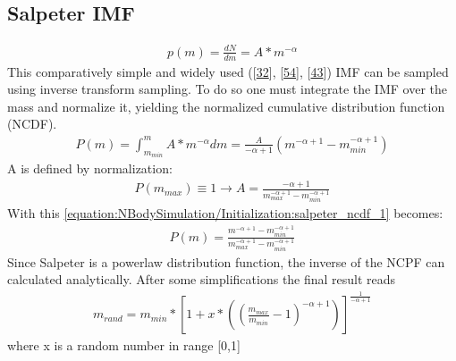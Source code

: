 \documentclass[letterpaper,10pt,english]{sphinxmanual}
\begin{document}
\subsection{Salpeter IMF}
\label{\detokenize{NBodySimulation/Initialization:salpeter-imf}}\begin{equation}\label{equation:NBodySimulation/Initialization:salpeter}
\begin{split}p(m)=\frac{dN}{dm}=A*m^{-\alpha }\end{split}
\end{equation}
\sphinxAtStartPar
This comparatively simple and widely used ({[}\hyperlink{cite.NBodySimulation/Appendix:id46}{32}{]}, {[}\hyperlink{cite.NBodySimulation/Appendix:id47}{54}{]}, {[}\hyperlink{cite.NBodySimulation/Appendix:id48}{43}{]}) IMF can be sampled using inverse transform sampling.
To do so one must integrate the IMF over the mass and normalize it, yielding the normalized cumulative distribution function (NCDF).
\begin{equation}\label{equation:NBodySimulation/Initialization:salpeter_ncdf_1}
\begin{split}P(m)=\int_{m_{min}}^{m}A*m^{-\alpha } dm = \frac{A}{-\alpha +1}\left ( m^{-\alpha +1} -m_{min}^{-\alpha +1}\right )\end{split}
\end{equation}
\sphinxAtStartPar
A is defined by normalization:
\begin{equation*}
\begin{split}P({m_{max}})\equiv 1\rightarrow A=\frac{-\alpha +1}{m_{max}^{-\alpha +1} -m_{min}^{-\alpha +1} }\end{split}
\end{equation*}
\sphinxAtStartPar
With this \eqref{equation:NBodySimulation/Initialization:salpeter_ncdf_1} becomes:
\begin{equation*}
\begin{split}P(m)=\frac{m^{-\alpha +1} -m_{min}^{-\alpha +1}}{m_{max}^{-\alpha +1} -m_{min}^{-\alpha +1}}\end{split}
\end{equation*}
\sphinxAtStartPar
Since Salpeter is a power\sphinxhyphen{}law distribution function, the inverse of the NCPF can calculated analytically. After some simplifications the final result reads
\begin{equation*}
\begin{split}m_{rand} = m_{min}*\left [ 1+x*\left ( \left ( \frac{m_{max}}{m_{min}} -1\right )^{-\alpha +1} \right ) \right ]^{\frac{1}{-\alpha +1}}\end{split}
\end{equation*}
\sphinxAtStartPar
where x is a random number in range {[}0,1{]}
\end{document}
